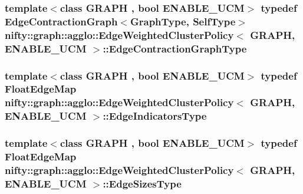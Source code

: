 \subsubsection[{Edge\+Contraction\+Graph\+Type}]{\setlength{\rightskip}{0pt plus 5cm}template$<$class G\+R\+A\+P\+H , bool E\+N\+A\+B\+L\+E\+\_\+\+U\+C\+M$>$ typedef {\bf Edge\+Contraction\+Graph}$<${\bf Graph\+Type}, {\bf Self\+Type}$>$ {\bf nifty\+::graph\+::agglo\+::\+Edge\+Weighted\+Cluster\+Policy}$<$ G\+R\+A\+P\+H, E\+N\+A\+B\+L\+E\+\_\+\+U\+C\+M $>$\+::{\bf Edge\+Contraction\+Graph\+Type}}\label{classnifty_1_1graph_1_1agglo_1_1EdgeWeightedClusterPolicy_af2c3024ed1be514c58004dfa7e77448b}
\hypertarget{classnifty_1_1graph_1_1agglo_1_1EdgeWeightedClusterPolicy_a1b8107133a86be855885f1910652b0af}{}
\subsubsection[{Edge\+Indicators\+Type}]{\setlength{\rightskip}{0pt plus 5cm}template$<$class G\+R\+A\+P\+H , bool E\+N\+A\+B\+L\+E\+\_\+\+U\+C\+M$>$ typedef Float\+Edge\+Map {\bf nifty\+::graph\+::agglo\+::\+Edge\+Weighted\+Cluster\+Policy}$<$ G\+R\+A\+P\+H, E\+N\+A\+B\+L\+E\+\_\+\+U\+C\+M $>$\+::{\bf Edge\+Indicators\+Type}}\label{classnifty_1_1graph_1_1agglo_1_1EdgeWeightedClusterPolicy_a1b8107133a86be855885f1910652b0af}
\hypertarget{classnifty_1_1graph_1_1agglo_1_1EdgeWeightedClusterPolicy_a64d646cc14e503e9a76a4646234d9754}{}
\subsubsection[{Edge\+Sizes\+Type}]{\setlength{\rightskip}{0pt plus 5cm}template$<$class G\+R\+A\+P\+H , bool E\+N\+A\+B\+L\+E\+\_\+\+U\+C\+M$>$ typedef Float\+Edge\+Map {\bf nifty\+::graph\+::agglo\+::\+Edge\+Weighted\+Cluster\+Policy}$<$ G\+R\+A\+P\+H, E\+N\+A\+B\+L\+E\+\_\+\+U\+C\+M $>$\+::{\bf Edge\+Sizes\+Type}}\label{classnifty_1_1graph_1_1agglo_1_1EdgeWeightedClusterPolicy_a64d646cc14e503e9a76a4646234d9754}
\hypertarget{classnifty_1_1graph_1_1agglo_1_1EdgeWeightedClusterPolicy_a8e910f7b9d0c1baa1de7b6b1c3e58397}{}
